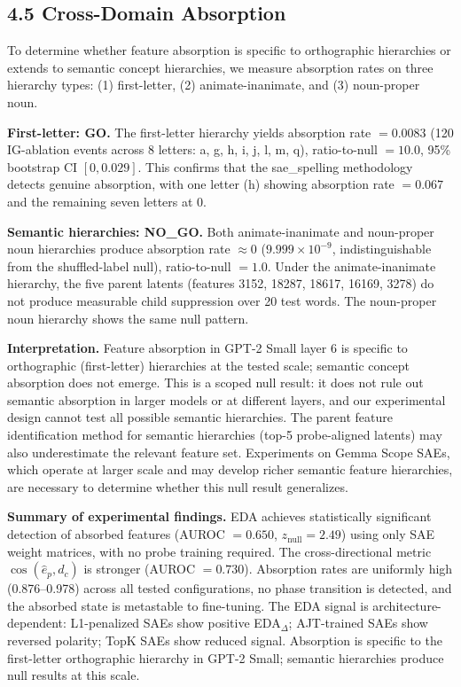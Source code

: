 \documentclass{article}
\begin{document}
\subsection{4.5 Cross-Domain Absorption}

To determine whether feature absorption is specific to orthographic hierarchies or extends to
semantic concept hierarchies, we measure absorption rates on three hierarchy types:
(1) first-letter, (2) animate-inanimate, and (3) noun-proper noun.

\textbf{First-letter: GO.} The first-letter hierarchy yields absorption rate $= 0.0083$
(120 IG-ablation events across 8 letters: a, g, h, i, j, l, m, q),
ratio-to-null $= 10.0$, 95\% bootstrap CI $[0, 0.029]$.
This confirms that the sae_spelling methodology detects genuine absorption, with one letter
(h) showing absorption rate $= 0.067$ and the remaining seven letters at 0.

\textbf{Semantic hierarchies: NO\_GO.} Both animate-inanimate and noun-proper noun hierarchies
produce absorption rate $\approx 0$ ($9.999 \times 10^{-9}$, indistinguishable from the
shuffled-label null), ratio-to-null $= 1.0$.
Under the animate-inanimate hierarchy, the five parent latents (features 3152, 18287, 18617,
16169, 3278) do not produce measurable child suppression over 20 test words.
The noun-proper noun hierarchy shows the same null pattern.

\textbf{Interpretation.} Feature absorption in GPT-2 Small layer 6 is specific to orthographic
(first-letter) hierarchies at the tested scale; semantic concept absorption does not emerge.
This is a scoped null result: it does not rule out semantic absorption in larger models or
at different layers, and our experimental design cannot test all possible semantic hierarchies.
The parent feature identification method for semantic hierarchies (top-5 probe-aligned latents)
may also underestimate the relevant feature set.
Experiments on Gemma Scope SAEs, which operate at larger scale and may develop richer semantic
feature hierarchies, are necessary to determine whether this null result generalizes.


\textbf{Summary of experimental findings.} EDA achieves statistically significant detection of
absorbed features (AUROC $= 0.650$, $z_\text{null} = 2.49$) using only SAE weight matrices,
with no probe training required. The cross-directional metric $\cos(\hat{e}_p, d_c)$ is
stronger (AUROC $= 0.730$). Absorption rates are uniformly high (0.876–0.978) across all
tested configurations, no phase transition is detected, and the absorbed state is metastable
to fine-tuning. The EDA signal is architecture-dependent: L1-penalized SAEs show positive
EDA$_\Delta$; AJT-trained SAEs show reversed polarity; TopK SAEs show reduced signal.
Absorption is specific to the first-letter orthographic hierarchy in GPT-2 Small; semantic
hierarchies produce null results at this scale.
\end{document}

